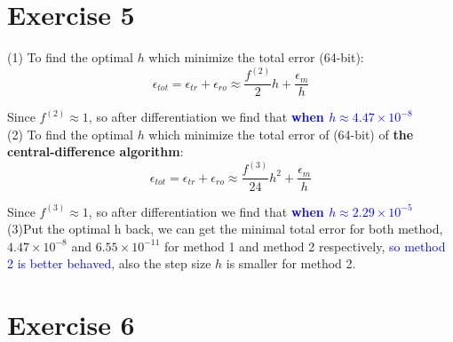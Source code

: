 \documentclass[aps,12pt,prd,nofootinbib,bibnotes, amsmath,amssymb,showpacs,superscriptaddress,floatfix]{revtex4-2}
\begin{document}
\section{Exercise 5}
(1)
To find the optimal $h$ which minimize the total error (64-bit):
\begin{equation}
\epsilon_{tot}=\epsilon_{tr}+\epsilon_{ro} \approx \frac{f^{(2)}}{2} h + \frac{\epsilon_{m}}{h}
\end{equation}

Since $f^{(2)} \approx 1$, so after differentiation we find that \textcolor{blue}{\bf{when $h \approx 4.47 \times 10^{-8}$}} \\

(2)
To find the optimal $h$ which minimize the total error of (64-bit) of {\bf{the central-difference algorithm}}:
\begin{equation}
\epsilon_{tot}=\epsilon_{tr}+\epsilon_{ro} \approx \frac{f^{(3)}}{24} h^2 + \frac{\epsilon_{m}}{h}
\end{equation}

Since $f^{(3)} \approx 1$, so after differentiation we find that \textcolor{blue}{\bf{when $h \approx 2.29 \times 10^{-5}$}} \\

(3)Put the optimal h back, we can get the minimal total error for both method, $4.47 \times 10^{-8}$ and $6.55 \times 10^{-11}$ for method 1 and method 2 respectively, {\textcolor{blue}{so method 2 is better behaved}}, also the step size $h$ is smaller for method 2.

\section{Exercise 6}



\end{document}
